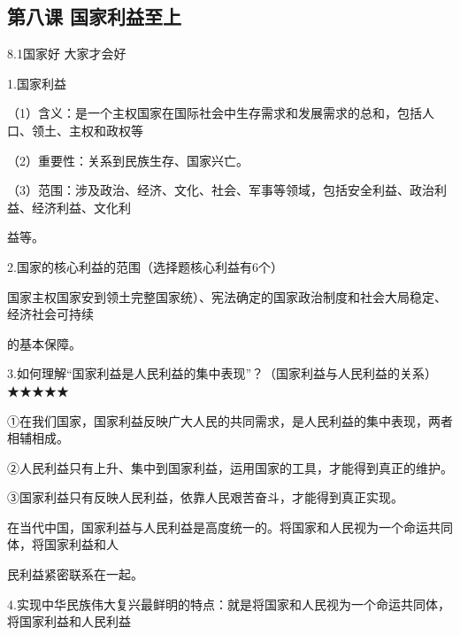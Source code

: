\documentclass[lang=cn,11pt]{elegantbook}
\newcommand{\daofasym}[1]{{\daofasymbolfont #1}}
\newcommand{\daofasym}[1]{#1}
\begin{document}
\subsection*{第八课 国家利益至上}

8.1国家好 大家才会好\par

1.国家利益\par

（1）含义：是一个主权国家在国际社会中生存需求和发展需求的总和，包括人口、领土、主权和政权等\par

（2）重要性：关系到民族生存、国家兴亡。\par

（3）范围：涉及政治、经济、文化、社会、军事等领域，包括安全利益、政治利益、经济利益、文化利\par

益等。\par

2.国家的核心利益的范围（选择题核心利益有6个）\par

国家主权国家安到领土完整国家统）、宪法确定的国家政治制度和社会大局稳定、经济社会可持续\par

的基本保障。\par

3.如何理解“国家利益是人民利益的集中表现”？（国家利益与人民利益的关系）\daofasym{★}\daofasym{★}\daofasym{★}\daofasym{★}\daofasym{★}\par

\daofasym{①}在我们国家，国家利益反映广大人民的共同需求，是人民利益的集中表现，两者相辅相成。\par

\daofasym{②}人民利益只有上升、集中到国家利益，运用国家的工具，才能得到真正的维护。\par

\daofasym{③}国家利益只有反映人民利益，依靠人民艰苦奋斗，才能得到真正实现。\par

在当代中国，国家利益与人民利益是高度统一的。将国家和人民视为一个命运共同体，将国家利益和人\par

民利益紧密联系在一起。\par

4.实现中华民族伟大复兴最鲜明的特点：就是将国家和人民视为一个命运共同体，将国家利益和人民利益\par
\end{document}
